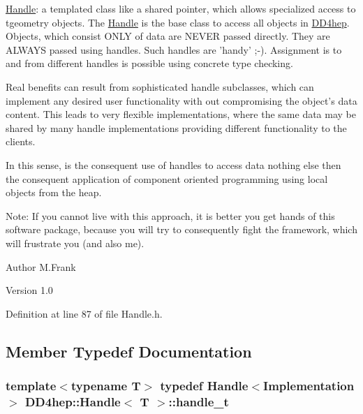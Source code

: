 \hyperlink{class_d_d4hep_1_1_handle}{Handle}: a templated class like a shared pointer, which allows specialized access to tgeometry objects. The \hyperlink{class_d_d4hep_1_1_handle}{Handle} is the base class to access all objects in \hyperlink{namespace_d_d4hep}{DD4hep}. Objects, which consist ONLY of data are NEVER passed directly. They are ALWAYS passed using handles. Such handles are 'handy' ;-\/). Assignment is to and from different handles is possible using concrete type checking.

Real benefits can result from sophisticated handle subclasses, which can implement any desired user functionality with out compromising the object's data content. This leads to very flexible implementations, where the same data may be shared by many handle implementations providing different functionality to the clients.

In this sense, is the consequent use of handles to access data nothing else then the consequent application of component oriented programming using local objects from the heap.

Note: If you cannot live with this approach, it is better you get hands of this software package, because you will try to consequently fight the framework, which will frustrate you (and also me).

\begin{DoxyAuthor}{Author}
M.Frank 
\end{DoxyAuthor}
\begin{DoxyVersion}{Version}
1.0 
\end{DoxyVersion}


Definition at line 87 of file Handle.h.

\subsection{Member Typedef Documentation}
\hypertarget{class_d_d4hep_1_1_handle_a3d9df9d5b334e984b288ffbabcacb564}{
\subsubsection[{handle\_\-t}]{\setlength{\rightskip}{0pt plus 5cm}template$<$typename T$>$ typedef {\bf Handle}$<${\bf Implementation}$>$ {\bf DD4hep::Handle}$<$ {\bf T} $>$::{\bf handle\_\-t}}}
\label{class_d_d4hep_1_1_handle_a3d9df9d5b334e984b288ffbabcacb564}


